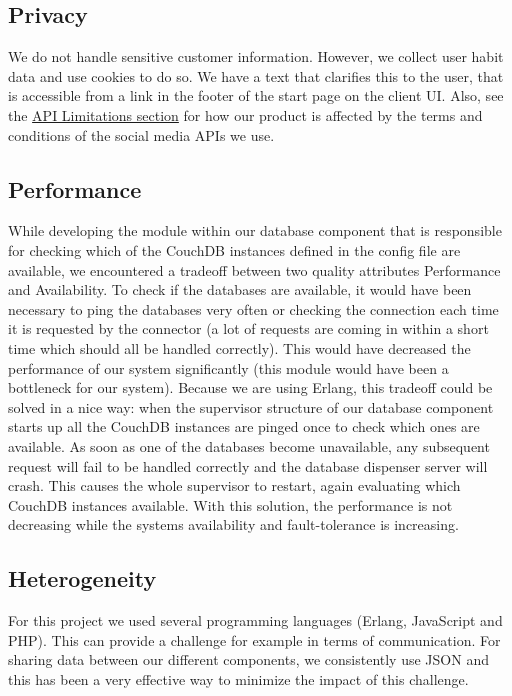 \subsection{Privacy}
We do not handle sensitive customer information. However, we collect user habit
data and use cookies to do so. We have a text that clarifies this to the user,
that is accessible from a link in the footer of the start page on the client UI.
\newline
Also, see the \hyperlink{apilimits}{API Limitations section} for how our product
is affected by the terms and conditions of the social media APIs we use.

\subsection{Performance}
While developing the module within our database component that is responsible
for checking which of the CouchDB instances defined in the config file are
available, we encountered a tradeoff between two quality attributes Performance
and Availability. \newline
To check if the databases are available, it would have been necessary to ping
the databases very often or checking the connection each time it is requested by
the connector (a lot of requests are coming in within a short time which should
all be handled correctly). This would have decreased the performance of our
system significantly (this module would have been a bottleneck for our system).
\newline
Because we are using Erlang, this tradeoff could be solved in a nice way: when
the supervisor structure of our database component starts up all the CouchDB
instances are pinged once to check which ones are available. As soon as one of
the databases become unavailable, any subsequent request will fail to be handled
correctly and the database dispenser server will crash. This causes the whole
supervisor to restart, again evaluating which CouchDB instances available. With
this solution, the performance is not decreasing while the systems availability
and fault-tolerance is increasing.

\subsection{Heterogeneity}
For this project we used several programming languages (Erlang, JavaScript and
PHP). This can provide a challenge for example in terms of communication. For
sharing data between our different components, we consistently use JSON and this
has been a very effective way to minimize the impact of this challenge.

